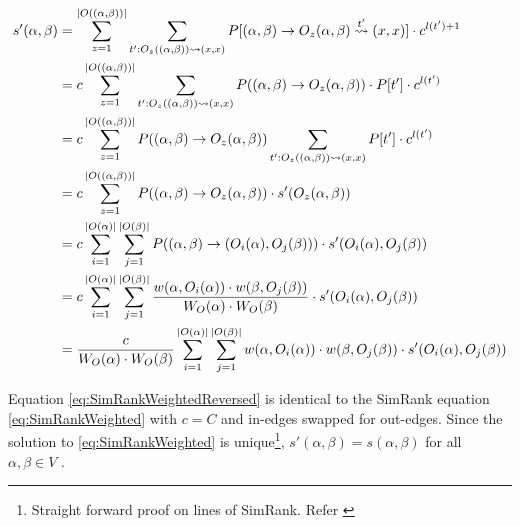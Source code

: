 \begin{align}
s'(\alpha,\beta)  
 &= \sum_{z=1}^{|O((\alpha,\beta))|} \sum_{t':O_z((\alpha,\beta)) \rightsquigarrow (x,x)} P[(\alpha,\beta) \rightarrow O_z(\alpha,\beta) \overset{t'}{\rightsquigarrow} (x,x)]  \cdot  c^{l(t')+1}  \notag \\
 &= c \sum_{z=1}^{|O((\alpha,\beta))|} \sum_{t':O_z((\alpha,\beta)) \rightsquigarrow (x,x)} P((\alpha,\beta) \rightarrow O_z(\alpha,\beta))  \cdot  P[t']  \cdot  c^{l(t')}    \notag \\
 &= c \sum_{z=1}^{|O((\alpha,\beta))|} P((\alpha,\beta) \rightarrow O_z(\alpha,\beta))  \sum_{t':O_z((\alpha,\beta)) \rightsquigarrow (x,x)}   P[t']  \cdot  c^{l(t')}    \notag \\
 &= c \sum_{z=1}^{|O((\alpha,\beta))|} P((\alpha,\beta) \rightarrow O_z(\alpha,\beta))  \cdot s'(O_z(\alpha,\beta))    \notag \\
 &= c \sum_{i=1}^{|O(\alpha)|} \sum_{j=1}^{|O(\beta)|} P((\alpha,\beta) \rightarrow (O_i(\alpha),O_j(\beta)))  \cdot s'(O_i(\alpha),O_j(\beta))    \notag \\
 &= c \sum_{i=1}^{|O(\alpha)|} \sum_{j=1}^{|O(\beta)|} \frac{ w(\alpha,O_i(\alpha)) \cdot w(\beta,O_j(\beta)) } { W_{O}(\alpha) \cdot W_O(\beta)}  \cdot s'(O_i(\alpha),O_j(\beta))    \notag \\
 &= \frac{c}{{ W_{O}(\alpha) \cdot W_O(\beta)}} \sum_{i=1}^{|O(\alpha)|} \sum_{j=1}^{|O(\beta)|} w(\alpha,O_i(\alpha)) \cdot w(\beta,O_j(\beta)) \cdot s'(O_i(\alpha),O_j(\beta)) \label{eq:SimRankWeightedReversed}
\end{align}

Equation \ref{eq:SimRankWeightedReversed} is identical to the SimRank equation \ref{eq:SimRankWeighted} with $c = C$ and in-edges swapped for out-edges. 
Since the solution to \ref{eq:SimRankWeighted} is unique\footnote{Straight forward proof on lines of SimRank. Refer \citep{Jeh02simrank}}, $s'(\alpha, \beta) = s(\alpha, \beta)$ for all $\alpha, \beta \in V$ . 